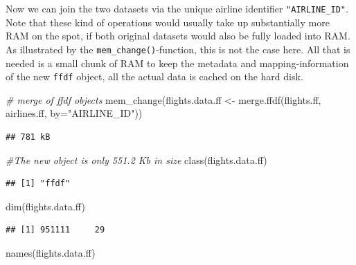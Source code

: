 \documentclass[
  12pt,
]{style/krantz}
\newenvironment{Shaded}{\begin{snugshade}}{\end{snugshade}}
\newcommand{\AttributeTok}[1]{\textcolor[rgb]{0.77,0.63,0.00}{#1}}
\newcommand{\CommentTok}[1]{\textcolor[rgb]{0.56,0.35,0.01}{\textit{#1}}}
\newcommand{\FunctionTok}[1]{\textcolor[rgb]{0.00,0.00,0.00}{#1}}
\newcommand{\NormalTok}[1]{#1}
\newcommand{\OtherTok}[1]{\textcolor[rgb]{0.56,0.35,0.01}{#1}}
\newcommand{\StringTok}[1]{\textcolor[rgb]{0.31,0.60,0.02}{#1}}
\begin{document}
Now we can join the two datasets via the unique airline identifier \texttt{"AIRLINE\_ID"}. Note that these kind of operations would usually take up substantially more RAM on the spot, if both original datasets would also be fully loaded into RAM. As illustrated by the \texttt{mem\_change()}-function, this is not the case here. All that is needed is a small chunk of RAM to keep the metadata and mapping-information of the new \texttt{ffdf} object, all the actual data is cached on the hard disk.

\begin{Shaded}
\begin{Highlighting}[]
\CommentTok{\# merge of ffdf objects}
\FunctionTok{mem\_change}\NormalTok{(flights.data.ff }\OtherTok{\textless{}{-}} \FunctionTok{merge.ffdf}\NormalTok{(flights.ff, airlines.ff, }\AttributeTok{by=}\StringTok{"AIRLINE\_ID"}\NormalTok{))}
\end{Highlighting}
\end{Shaded}

\begin{verbatim}
## 781 kB
\end{verbatim}

\begin{Shaded}
\begin{Highlighting}[]
\CommentTok{\#The new object is only 551.2 Kb in size}
\FunctionTok{class}\NormalTok{(flights.data.ff)}
\end{Highlighting}
\end{Shaded}

\begin{verbatim}
## [1] "ffdf"
\end{verbatim}

\begin{Shaded}
\begin{Highlighting}[]
\FunctionTok{dim}\NormalTok{(flights.data.ff)}
\end{Highlighting}
\end{Shaded}

\begin{verbatim}
## [1] 951111     29
\end{verbatim}

\begin{Shaded}
\begin{Highlighting}[]
\FunctionTok{names}\NormalTok{(flights.data.ff)}
\end{Highlighting}
\end{Shaded}
\end{document}
